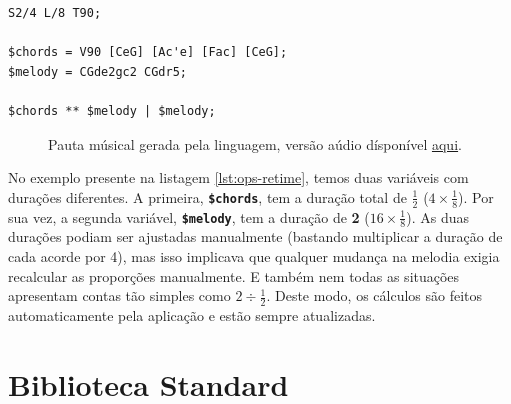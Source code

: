 \begin{lstlisting}[caption={Redimensionamento da duração de uma expressão músical},label=lst:ops-retime,belowcaptionskip=-\medskipamount]
S2/4 L/8 T90;

$chords = V90 [CeG] [Ac'e] [Fac] [CeG];
$melody = CGde2gc2 CGdr5;

$chords ** $melody | $melody;
\end{lstlisting}

\begin{figure}[ht]
  \centering
  {%
  \setlength{\fboxsep}{0pt}%
  \setlength{\fboxrule}{0pt}%
  }%
  \caption{Pauta músical gerada pela linguagem, versão aúdio dísponível \href{https://drive.google.com/file/d/1aVVXGDVQEAmHl-jadSnZ6OqIGmgqhgxR}{\underline{aqui}}\protect\footnotemark.}
  \label{fig:ops-retime}
\end{figure}

No exemplo presente na listagem \ref{lst:ops-retime}, temos duas variáveis com durações diferentes. A primeira, \textbf{\texttt{\$chords}}, tem a duração total de \textbf{$\frac{1}{2}$} ($4 \times \frac{1}{8}$). Por sua vez, a segunda variável, \textbf{\texttt{\$melody}}, tem a duração de \textbf{2} ($16 \times \frac{1}{8}$). As duas durações podiam ser ajustadas manualmente (bastando multiplicar a duração de cada acorde por 4), mas isso implicava que qualquer mudança na melodia exigia recalcular as proporções manualmente. E também nem todas as situações apresentam contas tão simples como $2 \div \frac{1}{2}$. Deste modo, os cálculos são feitos automaticamente pela aplicação e estão sempre atualizadas.

\section{Biblioteca Standard}
